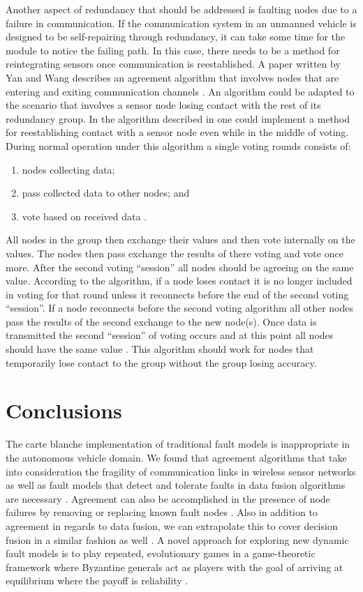 \documentclass[twoside, conference]{IEEEtran}%
\begin{document}
Another aspect of redundancy that should be addressed is faulting nodes due to a failure in communication. If the communication system in an unmanned vehicle is designed to be self-repairing through redundancy, it can take some time for the module to notice the failing path. In this case, there needs to be a method for reintegrating sensors once communication is reestablished. A paper written by Yan and Wang describes an agreement algorithm that involves nodes that are entering and exiting communication channels \cite{Yan2007}. An algorithm could be adapted to the scenario that involves a sensor node losing contact with the rest of its redundancy group. In the algorithm described in \cite{Yan2007} one could implement a method for reestablishing contact with a sensor node even while in the middle of voting. During normal operation under this algorithm a single voting rounds consists of:
\begin{enumerate}
	\item nodes collecting data;
	\item pass collected data to other nodes; and
	\item vote based on received data \cite{Yan2007}.
\end{enumerate} 
All nodes in the group then exchange their values and then vote internally on the values. The nodes then pass exchange the results of there voting and vote once more. After the second voting ``session'' all nodes should be agreeing on the same value. According to the algorithm, if a node loses contact it is no longer included in voting for that round unless it reconnects before the end of the second voting ``session''. If a node reconnects before the second voting algorithm all other nodes pass the results of the second exchange to the new node(s). Once data is transmitted the second ``session'' of voting occurs and at this point all nodes should have the same value \cite{Yan2007}. This algorithm should work for nodes that temporarily lose contact to the group without the group losing accuracy.

\section{Conclusions}\label{sec:conclusions}
The carte blanche implementation of traditional fault models is inappropriate in the autonomous vehicle domain.  We found that agreement algorithms that take into consideration the fragility of communication links in wireless sensor networks as well as fault models that detect and tolerate faults in data fusion algorithms are necessary \cite{Biely2007,Bader2014}.  Agreement can also be accomplished in the presence of node failures by removing or replacing known fault nodes \cite{Ren2001}.  Also in addition to agreement in regards to data fusion, we can extrapolate this to cover decision fusion in a similar fashion as well \cite{Clouqueur2004}.  A novel approach for exploring new dynamic fault models is to play repeated, evolutionary games in a game-theoretic framework where Byzantine generals act as players with the goal of arriving at equilibrium where the payoff is reliability \cite{Ma2008}.



\end{document}
